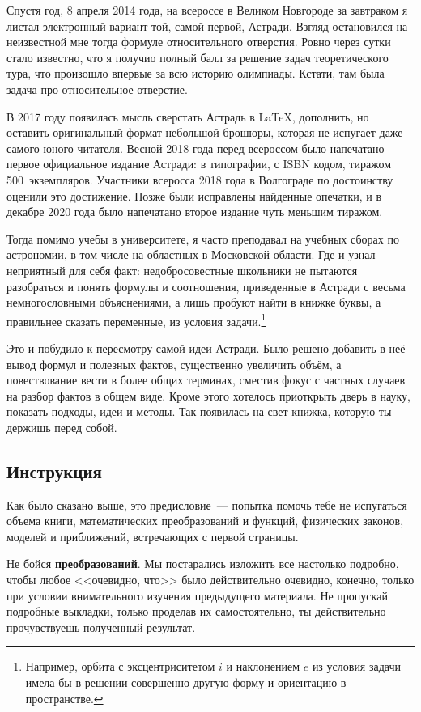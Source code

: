Спустя год, 8 апреля 2014 года, на всероссе в Великом Новгороде за завтраком я листал электронный вариант той, самой первой, Астради. Взгляд остановился на неизвестной мне тогда формуле относительного отверстия. Ровно через сутки стало известно, что я получио полный балл за решение задач теоретического тура, что произошло впервые за всю историю олимпиады. Кстати, там была задача про относительное отверстие.

В 2017 году появилась мысль сверстать Астрадь в \LaTeX, дополнить, но оставить оригинальный формат небольшой брошюры, которая не испугает даже самого юного читателя. Весной 2018 года перед всероссом было напечатано первое официальное издание Астради: в типографии, с ISBN кодом, тиражом 500~экземпляров. Участники всеросса 2018 года в Волгограде по достоинству оценили это достижение. Позже были исправлены найденные опечатки, и в декабре 2020 года было напечатано второе издание чуть меньшим тиражом.

Тогда помимо учебы в университете, я часто преподавал на учебных сборах по астрономии, в том числе на областных в Московской области. Где и узнал неприятный для себя факт: недобросовестные школьники не пытаются разобраться и понять формулы и соотношения, приведенные в Астради с весьма немногословными объяснениями, а лишь пробуют найти в книжке буквы, а правильнее сказать переменные, из условия задачи.\footnote{Например, орбита с эксцентриситетом $i$ и наклонением $e$ из условия задачи имела бы в решении совершенно другую форму и ориентацию в пространстве.}

Это и побудило к пересмотру самой идеи Астради. Было решено добавить в неё вывод формул и полезных фактов, существенно увеличить объём, а повествование вести в более общих терминах, сместив фокус с частных случаев на разбор фактов в общем виде. Кроме этого хотелось приоткрыть дверь в науку, показать подходы, идеи и методы. Так появилась на свет книжка, которую ты держишь перед собой. 

\subsection*{Инструкция}
Как было сказано выше, это предисловие~--- попытка помочь тебе не испугаться объема книги, математических преобразований и функций, физических законов, моделей и приближений, встречающих с первой страницы.

Не бойся \textbf{преобразований}. Мы постарались изложить все настолько подробно, чтобы любое <<очевидно, что>> было действительно очевидно, конечно, только при условии внимательного изучения предыдущего материала. Не пропускай подробные выкладки, только проделав их самостоятельно, ты действительно прочувствуешь полученный результат.

